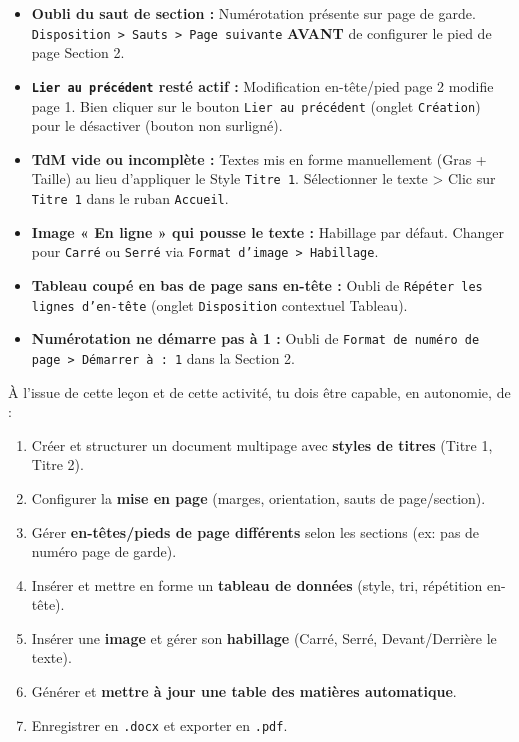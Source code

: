 \documentclass[11pt]{article}
\begin{document}
\begin{attention}
\begin{itemize}
    \item \textbf{Oubli du saut de section :} Numérotation présente sur page de garde. \rightarrow \texttt{Disposition > Sauts > Page suivante} \textbf{AVANT} de configurer le pied de page Section 2.
    \item \textbf{\texttt{Lier au précédent} resté actif :} Modification en-tête/pied page 2 modifie page 1. \rightarrow Bien cliquer sur le bouton \texttt{Lier au précédent} (onglet \texttt{Création}) pour le désactiver (bouton non surligné).
    \item \textbf{TdM vide ou incomplète :} Textes mis en forme manuellement (Gras + Taille) au lieu d'appliquer le Style \texttt{Titre 1}. \rightarrow Sélectionner le texte > Clic sur \texttt{Titre 1} dans le ruban \texttt{Accueil}.
    \item \textbf{Image « En ligne » qui pousse le texte :} Habillage par défaut. \rightarrow Changer pour \texttt{Carré} ou \texttt{Serré} via \texttt{Format d'image > Habillage}.
    \item \textbf{Tableau coupé en bas de page sans en-tête :} Oubli de \texttt{Répéter les lignes d'en-tête} (onglet \texttt{Disposition} contextuel Tableau).
    \item \textbf{Numérotation ne démarre pas à 1 :} Oubli de \texttt{Format de numéro de page > Démarrer à : 1} dans la Section 2.
\end{itemize}
\end{attention}

\begin{aretenir}
À l'issue de cette leçon et de cette activité, tu dois être capable, en autonomie, de :
\begin{enumerate}
    \item Créer et structurer un document multipage avec \textbf{styles de titres} (Titre 1, Titre 2).
    \item Configurer la \textbf{mise en page} (marges, orientation, sauts de page/section).
    \item Gérer \textbf{en-têtes/pieds de page différents} selon les sections (ex: pas de numéro page de garde).
    \item Insérer et mettre en forme un \textbf{tableau de données} (style, tri, répétition en-tête).
    \item Insérer une \textbf{image} et gérer son \textbf{habillage} (Carré, Serré, Devant/Derrière le texte).
    \item Générer et \textbf{mettre à jour une table des matières automatique}.
    \item Enregistrer en \texttt{.docx} et exporter en \texttt{.pdf}.
\end{enumerate}
\end{aretenir}
\end{document}
